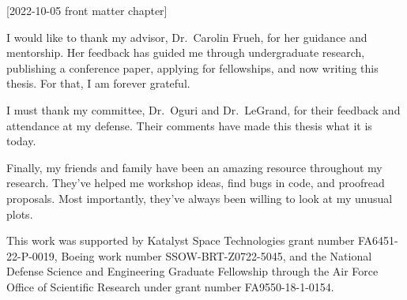 [2022-10-05 front matter chapter]
%
%
%
%
%
%

%
%
%
\begin{statement}
\end{statement}




\begin{acknowledgments}
  I would like to thank my advisor, Dr.~Carolin Frueh, for her guidance and mentorship. Her feedback has guided me through undergraduate research, publishing a conference paper, applying for fellowships, and now writing this thesis. For that, I am forever grateful.

  I must thank my committee, Dr.~Oguri and Dr.~LeGrand, for their feedback and attendance at my defense. Their comments have made this thesis what it is today.

  Finally,  my friends and family have been an amazing resource throughout my research. They've helped me workshop ideas, find bugs in code, and proofread proposals. Most importantly, they've always been willing to look at my unusual plots.

  This work was supported by Katalyst Space Technologies grant number FA6451-22-P-0019, Boeing work number SSOW-BRT-Z0722-5045, and the National Defense Science and Engineering Graduate Fellowship through the Air Force Office of Scientific Research under grant number FA9550-18-1-0154.
\end{acknowledgments}


